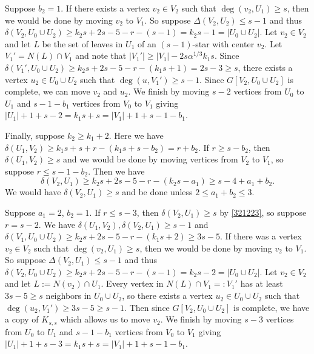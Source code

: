 \documentclass[oneside,12pt]{memoir}
\begin{document}
Suppose $b_2=1$.  If there exists a vertex $v_2\in V_2$ such that $\deg(v_2, U_1)\geq s$, then we would be done by moving $v_2$ to $V_1$.  So suppose $\Delta(V_2, U_2)\leq s-1$ and thus $\delta(V_2, U_0\cup U_2)\geq k_2s+2s-5-r-(s-1)=k_2s-1=|U_0\cup U_2|$.  Let $v_2\in V_2$ and let $L$ be the set of leaves in $U_1$ of an $(s-1)$-star with center $v_2$.  Let $V_1'=N(L)\cap V_1$ and note that $|V_1'|\geq |V_1|-2s\alpha^{1/3}k_1s$.  Since $\delta(V_1', U_0\cup U_2)\geq k_2s+2s-5-r-(k_1s+1)=2s-3\geq s$, there exists a vertex $u_2\in U_0\cup U_2$ such that $\deg(u, V_1')\geq s-1$.  Since $G[V_2, U_0\cup U_2]$ is complete, we can move $v_2$ and $u_2$.  We finish by moving $s-2$ vertices from $U_0$ to $U_1$ and $s-1-b_1$ vertices from $V_0$ to $V_1$ giving $|U_1|+1+s-2=k_1s+s=|V_1|+1+s-1-b_1$.  


Finally, suppose $k_2\geq k_1+2$.  Here we have $\delta(U_1, V_2)\geq k_1s+s+r-(k_1s+s-b_2)=r+b_2$.  If $r\geq s-b_2$, then $\delta(U_1, V_2)\geq s$ and we would be done by moving vertices from $V_2$ to $V_1$, so suppose $r\leq s-1-b_2$.  Then we have 
\begin{equation}\label{321223}
\delta(V_2, U_1)\geq k_2s+2s-5-r-(k_2s-a_1)\geq s-4+a_1+b_2.  
\end{equation}
We would have $\delta(V_2, U_1)\geq s$ and be done unless $2\leq a_1+b_2\leq 3$.

Suppose $a_1=2$, $b_2=1$.  If $r\leq s-3$, then $\delta(V_2, U_1)\geq s$ by \eqref{321223}, so suppose $r= s-2$.  We have $\delta(U_1, V_2), \delta(V_2, U_1)\geq s-1$ and $\delta(V_1, U_0\cup U_2)\geq k_2s+2s-5-r-(k_1s+2)\geq 3s-5$.  If there was a vertex $v_2\in V_2$ such that $\deg(v_2, U_1)\geq s$, then we would be done by moving $v_2$ to $V_1$.  So suppose $\Delta(V_2, U_1)\leq s-1$ and thus $\delta(V_2, U_0\cup U_2)\geq k_2s+2s-5-r-(s-1)=k_2s-2=|U_0\cup U_2|$. Let $v_2\in V_2$ and let $L:=N(v_2)\cap U_1$.  Every vertex in $N(L)\cap V_1=:V_1'$ has at least $3s-5\geq s$ neighbors in $U_0\cup U_2$, so there exists a vertex $u_2\in U_0\cup U_2$ such that $\deg(u_2, V_1')\geq 3s-5\geq s-1$.  Then since $G[V_2, U_0\cup U_2]$ is complete, we have a copy of $K_{s,s}$ which allows us to move $v_2$.  We finish by moving $s-3$ vertices from $U_0$ to $U_1$ and $s-1-b_1$ vertices from $V_0$ to $V_1$ giving $|U_1|+1+s-3=k_1s+s=|V_1|+1+s-1-b_1$.
\end{document}
